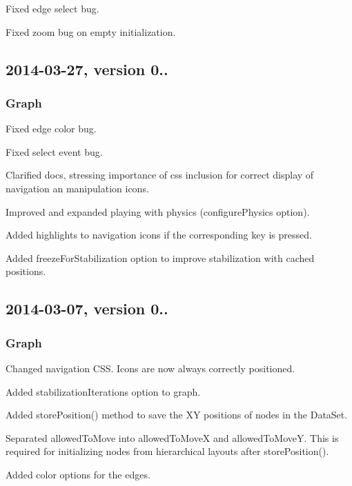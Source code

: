 \begin{DoxyItemize}
\item Fixed edge select bug.
\item Fixed zoom bug on empty initialization.
\end{DoxyItemize}

\subsection*{2014-\/03-\/27, version 0..}

\subsubsection*{Graph}


\begin{DoxyItemize}
\item Fixed edge color bug.
\item Fixed select event bug.
\item Clarified docs, stressing importance of css inclusion for correct display of navigation an manipulation icons.
\item Improved and expanded playing with physics (configure\+Physics option).
\item Added highlights to navigation icons if the corresponding key is pressed.
\item Added freeze\+For\+Stabilization option to improve stabilization with cached positions.
\end{DoxyItemize}

\subsection*{2014-\/03-\/07, version 0..}

\subsubsection*{Graph}


\begin{DoxyItemize}
\item Changed navigation C\+SS. Icons are now always correctly positioned.
\item Added stabilization\+Iterations option to graph.
\item Added store\+Position() method to save the XY positions of nodes in the Data\+Set.
\item Separated allowed\+To\+Move into allowed\+To\+MoveX and allowed\+To\+MoveY. This is required for initializing nodes from hierarchical layouts after store\+Position().
\item Added color options for the edges.
\end{DoxyItemize}


